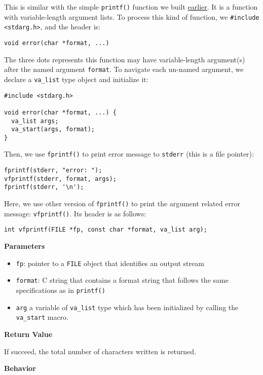 \documentclass[12pt]{article}
\begin{document}
This is similar with the simple \texttt{printf()} function we built \hyperref[org4bb8c28]{earlier}. It is a function with variable-length argument lists. To process this kind of function, we \texttt{\#include <stdarg.h>}, and the header is:
\begin{verbatim}
void error(char *format, ...)
\end{verbatim}
The three dots represents this function may have variable-length argument(s) after the named argument \texttt{format}. To navigate each un-named argument, we declare a \texttt{va\_list} type object and initialize it:
\begin{verbatim}
#include <stdarg.h>

void error(char *format, ...) {
  va_list args;
  va_start(args, format);
}
\end{verbatim}

Then, we use \texttt{fprintf()} to print error message to \texttt{stderr} (this is a file pointer):
\begin{verbatim}
fprintf(stderr, "error: ");
vfprintf(stderr, format, args);
fprintf(stderr, '\n');
\end{verbatim}

Here, we use other version of \texttt{fprintf()} to print the argument related error message: \texttt{vfprintf()}. Its header is as follows:
\begin{verbatim}
int vfprintf(FILE *fp, const char *format, va_list arg);
\end{verbatim}

\textbf{Parameters}

\begin{itemize}
\item \texttt{fp}: pointer to a \texttt{FILE} object that identifies an output stream
\item \texttt{format}: C string that contains a format string that follows the same specifications as in \texttt{printf()}
\item \texttt{arg} a variable of \texttt{va\_list} type which has been initialized by calling the \texttt{va\_start} macro.
\end{itemize}

\textbf{Return Value}

If succeed, the total number of characters written is returned.

\textbf{Behavior}
\end{document}
